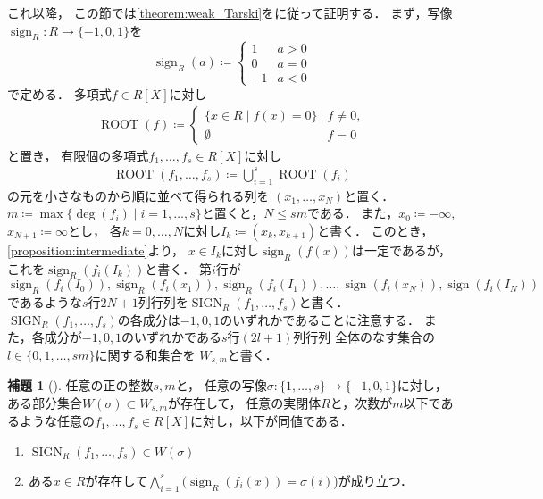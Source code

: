 \documentclass[uplatex, dvipdfmx]{jsarticle}
\numberwithin{equation}{section}
\newcommand{\map}[3]{{#1}\colon{#2}\rightarrow{#3}}
\DeclareMathOperator{\sign}{sign}
\DeclareMathOperator{\SIGN}{SIGN}
\DeclareMathOperator{\ROOT}{ROOT}
\theoremstyle{definition}
\newtheorem{lemma}[definition]{補題}
\begin{document}
これ以降，
この節では\cref{theorem:weak_Tarski}を\cite[Section 1.4]{MR1659509}に従って証明する．
まず，写像$\map{\sign_R}{R}{\{-1,0,1\}}$を
\begin{equation}
     \sign_R(a) \coloneqq
     \begin{cases}
          1 & a > 0 \\
          0 & a = 0 \\
          -1 & a < 0
     \end{cases}
\end{equation}
で定める．
多項式$f \in R[X]$に対し
\begin{align}
\ROOT(f) \coloneqq
\begin{cases}
     \{ x \in R \mid f(x) = 0 \} & f \ne 0, \\
     \emptyset & f = 0
\end{cases}
\end{align}
と置き，
有限個の多項式$f_1, \dots, f_s \in R[X]$に対し
\begin{align}
\ROOT(f_1,\ldots,f_s) \coloneqq \bigcup_{i=1}^s \ROOT(f_i)
\end{align}
の元を小さなものから順に並べて得られる列を
$(x_1,\dots,x_N)$と置く．
$m\coloneqq \max\{\deg(f_i) \mid i=1, \dots, s\}$と置くと，$N \leq sm$である．
また，$x_0 \coloneqq -\infty$,
$x_{N+1} \coloneqq \infty$とし，
各$k=0, \dots, N$に対し$I_k \coloneqq (x_k, x_{k+1})$と書く．
このとき，\cref{proposition:intermediate}より，
$x \in I_k$に対し$\sign_R(f(x))$は一定であるが，
これを$\sign_R(f_i(I_k))$と書く．
第$i$行が
\begin{equation}
     \sign_R(f_i(I_0)), \sign_R(f_i(x_1)), \sign_R(f_i(I_1)), \dots, \sign(f_i(x_N)), \sign(f_i(I_N))
\end{equation}
であるような$s$行$2N+1$列行列を$\SIGN_R(f_1, \dots, f_s)$と書く．
$\SIGN_R(f_1, \dots, f_s)$の各成分は$-1, 0, 1$のいずれかであることに注意する．
また，各成分が$-1,0,1$のいずれかである$s$行$(2l+1)$列行列
全体のなす集合の
$l \in \{0, 1, \ldots, sm\}$に関する和集合を
$W_{s,m}$と書く． 

\begin{lemma}[{\cite[Lemma 1.4.4.]{MR1659509}}]\label{lemma:qe_1ststep}
     任意の正の整数$s, m$と，
     任意の写像$\map{\sigma}{\{1, \dots, s\}}{\{-1,0,1\}}$に対し，
     ある部分集合$W(\sigma) \subset W_{s,m}$が存在して，
     任意の実閉体$R$と，次数が$m$以下であるような任意の$f_1, \dots, f_s \in R[X]$に対し，以下が同値である．
     \begin{enumerate}
          \item $\SIGN_R(f_1, \dots, f_s) \in W(\sigma)$
          \item ある$x \in R$が存在して$\bigwedge_{i=1}^s (\sign_R(f_i(x)) = \sigma(i)$)が成り立つ．
     \end{enumerate}
\end{lemma}
\end{document}
